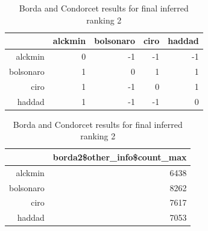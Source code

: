 \documentclass[hidelinks,11pt]{article}
\begin{document}
\begin{table}[H]
  \begin{subtable}[h]{0.4\textwidth}
    \centering
\begin{tabular}{rrrrr}
  \hline
 & alckmin & bolsonaro & ciro & haddad \\
  \hline
alckmin & 0 & -1 & -1 & -1 \\
  bolsonaro & 1 & 0 & 1 & 1 \\
  ciro & 1 & -1 & 0 & 1 \\
  haddad & 1 & -1 & -1 & 0 \\
   \hline
\end{tabular}
\caption{Pairwise Majority Comparisons }
\end{subtable}
\hfill
\begin{subtable}[h]{0.4\textwidth}
\centering
\begin{tabular}{rr}
  \hline
 & borda2\$other\_info\$count\_max \\
  \hline
alckmin & 6438 \\
  bolsonaro & 8262 \\
  ciro & 7617 \\
  haddad & 7053 \\
   \hline
\end{tabular}
\caption{Borda scores}
\end{subtable}
\caption{Borda and Condorcet results for final inferred ranking 2}
\end{table}
\end{document}
